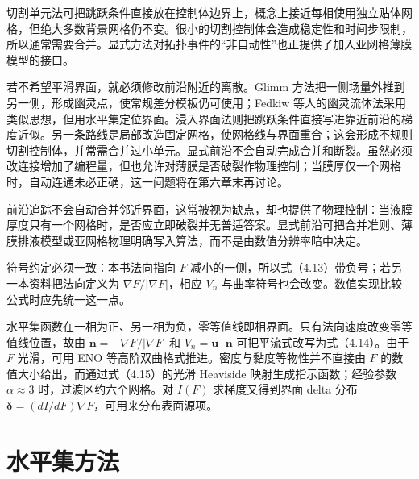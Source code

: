 \documentclass[11pt,a4paper,openany,fontset=none]{ctexbook}
\begin{document}
切割单元法可把跳跃条件直接放在控制体边界上，概念上接近每相使用独立贴体网格，但绝大多数背景网格仍不变。很小的切割控制体会造成稳定性和时间步限制，所以通常需要合并。显式方法对拓扑事件的“非自动性”也正提供了加入亚网格薄膜模型的接口。

若不希望平滑界面，就必须修改前沿附近的离散。Glimm 方法把一侧场量外推到另一侧，形成幽灵点，使常规差分模板仍可使用；Fedkiw 等人的幽灵流体法采用类似思想，但用水平集定位界面。浸入界面法则把跳跃条件直接写进靠近前沿的梯度近似。另一条路线是局部改造固定网格，使网格线与界面重合；这会形成不规则切割控制体，并常需合并过小单元。显式前沿不会自动完成合并和断裂。虽然必须改连接增加了编程量，但也允许对薄膜是否破裂作物理控制；当膜厚仅一个网格时，自动连通未必正确，这一问题将在第六章末再讨论。

前沿追踪不会自动合并邻近界面，这常被视为缺点，却也提供了物理控制：当液膜厚度只有一个网格时，是否应立即破裂并无普适答案。显式前沿可把合并准则、薄膜排液模型或亚网格物理明确写入算法，而不是由数值分辨率暗中决定。

符号约定必须一致：本书法向指向 $F$ 减小的一侧，所以式（4.13）带负号；若另一本资料把法向定义为 $\nabla F/|\nabla F|$，相应 $V_n$ 与曲率符号也会改变。数值实现比较公式时应先统一这一点。

水平集函数在一相为正、另一相为负，零等值线即相界面。只有法向速度改变零等值线位置，故由 $\bm n=-\nabla F/|\nabla F|$ 和 $V_n=\bm u\cdot\bm n$ 可把平流式改写为式（4.14）。由于 $F$ 光滑，可用 ENO 等高阶双曲格式推进。密度与黏度等物性并不直接由 $F$ 的数值大小给出，而通过式（4.15）的光滑 Heaviside 映射生成指示函数；经验参数 $\alpha\approx3$ 时，过渡区约六个网格。对 $I(F)$ 求梯度又得到界面 delta 分布 $\bm\delta=(dI/dF)\nabla F$，可用来分布表面源项。

\section{水平集方法}
\end{document}
